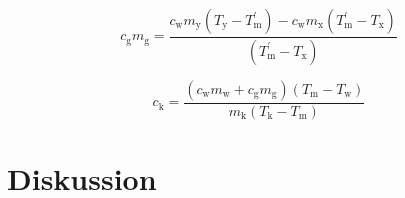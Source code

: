 \documentclass[titlepage = firstcover]{scrartcl}
\begin{document}
            \begin{equation}
                \label{eqn:Wärmekapazität}
                c_\text{g} m_\text{g} = \frac{c_\text{w} m_\text{y}(T_\text{y} - T_\text{m}^{'}) - c_\text{w} m_\text{x}(T_\text{m}^{'} - T_\text{x})}{(T_\text{m}^{'} - T_\text{x})}
            \end{equation}

            \begin{equation}
                \label{eqn:spezWärmekapazität}
                c_\text{k} = \frac{(c_\text{w} m_\text{w} + c_\text{g} m_\text{g})(T_\text{m} - T_\text{w})}{m_\text{k}(T_\text{k} - T_\text{m})}
            \end{equation}
    
    
    \section{Diskussion}
\end{document}
